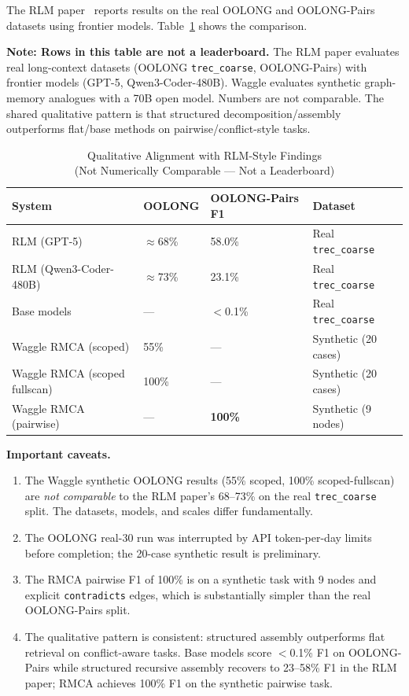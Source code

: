 \documentclass[conference]{IEEEtran}
\begin{document}
The RLM paper~\cite{zhang2026rlm} reports results on the real OOLONG and OOLONG-Pairs
datasets using frontier models. Table~\ref{tab:rlm_compare} shows the comparison.

\textbf{Note: Rows in this table are not a leaderboard.} The RLM paper evaluates real long-context datasets (OOLONG \texttt{trec\_coarse}, OOLONG-Pairs) with frontier models (GPT-5, Qwen3-Coder-480B). Waggle evaluates synthetic graph-memory analogues with a 70B open model. Numbers are not comparable. The shared qualitative pattern is that structured decomposition/assembly outperforms flat/base methods on pairwise/conflict-style tasks.

\begin{table}[htbp]
\caption{Qualitative Alignment with RLM-Style Findings\\
(Not Numerically Comparable --- Not a Leaderboard)}
\label{tab:rlm_compare}
\centering
\begin{tabular}{p{2.8cm}p{1.5cm}p{1.5cm}p{1.2cm}}
\toprule
\textbf{System} & \textbf{OOLONG} & \textbf{OOLONG-Pairs F1} & \textbf{Dataset} \\
\midrule
RLM (GPT-5)~\cite{zhang2026rlm} & $\approx$68\% & 58.0\% & Real \texttt{trec\_coarse} \\
RLM (Qwen3-Coder-480B)~\cite{zhang2026rlm} & $\approx$73\% & 23.1\% & Real \texttt{trec\_coarse} \\
Base models~\cite{zhang2026rlm} & --- & $<$0.1\% & Real \texttt{trec\_coarse} \\
\midrule
Waggle RMCA (scoped) & 55\% & --- & Synthetic (20 cases) \\
Waggle RMCA (scoped fullscan) & 100\% & --- & Synthetic (20 cases) \\
Waggle RMCA (pairwise) & --- & \textbf{100\%} & Synthetic (9 nodes) \\
\bottomrule
\end{tabular}
\end{table}

\textbf{Important caveats.}
\begin{enumerate}
\item The Waggle synthetic OOLONG results (55\% scoped, 100\% scoped-fullscan) are
\emph{not comparable} to the RLM paper's 68--73\% on the real \texttt{trec\_coarse} split.
The datasets, models, and scales differ fundamentally.
\item The OOLONG real-30 run was interrupted by API token-per-day limits before completion;
the 20-case synthetic result is preliminary.
\item The RMCA pairwise F1 of 100\% is on a synthetic task with 9 nodes and explicit
\texttt{contradicts} edges, which is substantially simpler than the real OOLONG-Pairs split.
\item The qualitative pattern is consistent: structured assembly outperforms flat retrieval
on conflict-aware tasks. Base models score $<$0.1\% F1 on OOLONG-Pairs while structured
recursive assembly recovers to 23--58\% F1 in the RLM paper; RMCA achieves 100\% F1 on
the synthetic pairwise task.
\end{enumerate}
\end{document}
